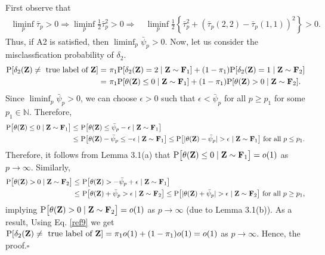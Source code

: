 \documentclass[twoside]{article}
\newcommand{\bZ}{\mathbf{Z}}
\newcommand{\bF}{\mathbf{F}}
\newcommand{\0}{\mathbf{0}}
\newcommand{\1}{\mathbf{1}}
\newcommand*{\QEDB}{\hfill\ensuremath{\square}}
\numberwithin{equation}{section}
\begin{document}

First observe that
\begin{align*}
\ \liminf\limits_{p}\bar{\tau}_p>0
\Rightarrow  \liminf\limits_{p}\frac{1}{2}\bar{\tau}_p^2>0
\Rightarrow &\ \liminf\limits_{p}\frac{1}{2}\left \{\bar{\tau}_p^2 + (\bar{\tau}_p(2,2) - \bar{\tau}_p(1,1))^2\right \}>0.
\end{align*}
Thus, if A2 is satisfied, then $\liminf_p\bar{\psi}_p>0.$ Now, let us consider the misclassfication probability of $\delta_2.$
\begin{align}\label{ref9}
 {\rm P}[\delta_2(\bZ)\neq \text{ true label of }\bZ]
 =&\ \pi_1 {\rm P}[\delta_2(\bZ)=2\mid \bZ\sim\bF_1]+ (1-\pi_1){\rm P}[\delta_2(\bZ)=1\mid \bZ\sim\bF_2]\nonumber \\
 =&\ \pi_1 {\rm P}[\theta(\bZ)\leq 0\mid \bZ\sim\bF_1]+ (1-\pi_1){\rm P}[\theta(\bZ)> 0\mid \bZ\sim\bF_2].
\end{align}
Since $\liminf_p\bar{\psi}_p>0$, we can choose $\epsilon>0 $ such that $\epsilon <\bar{\psi}_p$ for all $p\geq p_1$ for some $p_1\in\mathbb{N}.$ Therefore,
\begin{align*}
{\rm P}\big [\theta(\bZ)\leq 0\mid \bZ\sim\bF_1\big ]\leq &\ {\rm P}\big [\theta(\bZ)\leq \bar{\psi}_p-\epsilon\mid \bZ\sim\bF_1\big ]\\
\leq &\ {\rm P}\big [\theta(\bZ)- \bar{\psi}_p \leq -\epsilon\mid \bZ\sim\bF_1\big ]
\leq {\rm P}\big [|\theta(\bZ) - \bar{\psi}_p|>\epsilon\mid \bZ\sim\bF_1\big ]\text{ for all }p\leq p_1.
\end{align*}
Therefore, it follows from Lemma 3.1(a) that ${\rm P}\big [\theta(\bZ)\leq 0\mid \bZ\sim\bF_1\big ]=o(1)$ as $p\to\infty$.
Similarly,
\begin{align*}
{\rm P}\big [\theta(\bZ)> 0\mid \bZ\sim\bF_2\big ]
\leq &\ {\rm P}\big [\theta(\bZ)> -\bar{\psi}_p+\epsilon\mid \bZ\sim\bF_1\big ]\\
\leq &\ {\rm P}\big [\theta(\bZ)+ \bar{\psi}_p > \epsilon\mid \bZ\sim\bF_2\big ]
\leq {\rm P}\big [|\theta(\bZ) + \bar{\psi}_p|>\epsilon\mid \bZ\sim\bF_2\big ]\text{ for all }p\geq p_1,
\end{align*}
implying ${\rm P}\big [\theta(\bZ)> 0\mid \bZ\sim\bF_2\big ]=o(1)$ as $p\to\infty$ (due to Lemma 3.1(b)). As a result, Using Eq. \eqref{ref9} we get ${\rm P}[\delta_2(\bZ)\neq \text{ true label of }\bZ]=\pi_1o(1) + (1-\pi_1)o(1)=o(1)$ as $p\to\infty$. Hence, the proof.\hfill\QEDB\newline

\end{document}
